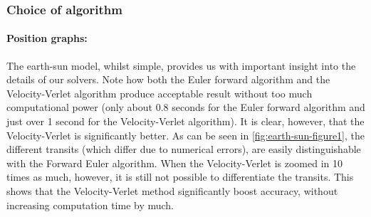 \documentclass[a4paper, 10pt]{article}
\begin{document}
\subsubsection{Choice of algorithm}
\paragraph{Position graphs:}
The earth-sun model, whilst simple, provides us with important insight into the details of our solvers. Note how both the Euler forward algorithm and the Velocity-Verlet algorithm produce acceptable result without too much computational power (only about 0.8 seconds for the Euler forward algorithm and just over 1 second for the Velocity-Verlet algorithm). It is clear, however, that the Velocity-Verlet is significantly better. As can be seen in \cref{fig:earth-sun-figure1}, the different transits (which differ due to numerical errors), are easily distinguishable with the Forward Euler algorithm. When the Velocity-Verlet is zoomed in 10 times as much, however, it is still not possible to differentiate the transits. This shows that the Velocity-Verlet method significantly boost accuracy, without increasing computation time by much.
\end{document}
